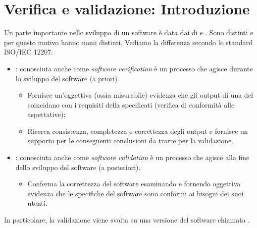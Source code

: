 \documentclass[../main]{subfiles}
\begin{document}
\section{Verifica e validazione: Introduzione}
Un parte importante nello sviluppo di un  software è data dai  di  e . Sono  distinti e per questo motivo hanno nomi distinti. Vediamo la differenza secondo lo standard ISO/IEC 12207:
\begin{itemize}
    \item {}: conosciuta anche come \textit{software verification} è un processo che agisce durante lo sviluppo del software (a priori).
    \begin{itemize}
        \item Fornisce un'oggettiva (ossia misurabile) evidenza che gli output di una  del  coincidano con i requisiti della  specificati (verifica di conformità alle aspettative);
        \item Ricerca consistenza, completezza e correttezza degli output e fornisce un supporto per le conseguenti conclusioni da trarre per la validazione.
    \end{itemize}
    \item {}: conosciuta anche come \textit{software validation} è un processo che agisce alla fine dello sviluppo del software (a posteriori).
    \begin{itemize}
        \item Conferma la correttezza del software esaminando e fornendo oggettiva evidenza che le specifiche del software sono conformi ai bisogni dei suoi utenti.
    \end{itemize}
\end{itemize}
In particolare, la validazione viene svolta su una versione del software chiamata .
\end{document}
